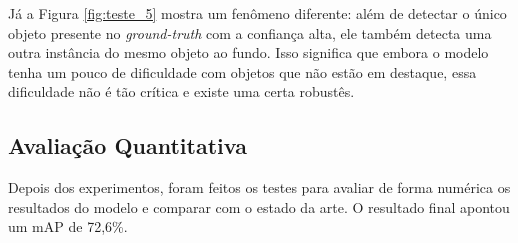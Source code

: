 Já a Figura \ref{fig:teste_5} mostra um fenômeno diferente: além de detectar o único objeto presente no \textit{ground-truth} com a confiança alta, ele também detecta uma outra instância do mesmo objeto ao fundo. Isso significa que embora o modelo tenha um pouco de dificuldade com objetos que não estão em destaque, essa dificuldade não é tão crítica e existe uma certa robustês.

\subsection{Avaliação Quantitativa}
\label{secao:5:1:3}

Depois dos experimentos, foram feitos os testes para avaliar de forma numérica os resultados do modelo e comparar com o estado da arte. O resultado final apontou um \ac{mAP} de 72,6\%. 

